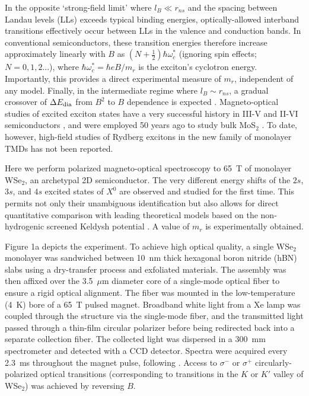 \documentclass[aps,prl,twocolumn]{revtex4-1}
\begin{document}
In the opposite `strong-field limit' where $l_B \ll r_{ns}$ and the spacing between Landau levels (LLs) exceeds typical binding energies, optically-allowed interband transitions effectively occur between LLs in the valence and conduction bands.  In conventional semiconductors, these transition energies therefore increase approximately linearly with $B$ as $ (N + \frac{1}{2})\hbar \omega_c^*$ (ignoring spin effects; $N=0, 1, 2...$), where $\hbar \omega_c^* = \hbar eB/m_r$ is the exciton's cyclotron energy. Importantly, this provides a direct experimental measure of $m_r$, independent of any model. Finally, in the intermediate regime where $l_B \sim r_{ns}$, a gradual crossover of $\Delta E_{\rm dia}$ from $B^2$ to $B$ dependence is expected \cite{Miura, Knox, Hasegawa, Ritchie, Edelstein}.  Magneto-optical studies of excited exciton states have a very successful history in III-V and II-VI semiconductors \cite{Miura, Knox}, and were employed 50 years ago to study bulk MoS$_2$ \cite{Evans}. To date, however, high-field studies of Rydberg excitons in the new family of monolayer TMDs has not been reported. 

Here we perform polarized magneto-optical spectroscopy to 65~T of monolayer WSe$_2$, an archetypal 2D semiconductor. The very different energy shifts of the $2s$, $3s$, and $4s$ excited states of $X^0$ are observed and studied for the first time.  This permits not only their unambiguous identification but also allows for direct quantitative comparison with leading theoretical models based on the non-hydrogenic screened Keldysh potential \cite{Berkelbach, Macdonald, Kyla}. A value of $m_r$ is experimentally obtained.

Figure 1a depicts the experiment. To achieve high optical quality, a single WSe$_2$ monolayer was sandwiched between 10~nm thick hexagonal boron nitride (hBN) slabs using a dry-transfer process and exfoliated materials.  The assembly was then affixed over the 3.5~$\mu$m diameter core of a single-mode optical fiber to ensure a rigid optical alignment. The fiber was mounted in the low-temperature (4~K) bore of a 65~T pulsed magnet.  Broadband white light from a Xe lamp was coupled through the structure via the single-mode fiber, and the transmitted light passed through a thin-film circular polarizer before being redirected back into a separate collection fiber. The collected light was dispersed in a 300~mm spectrometer and detected with a CCD detector.  Spectra were acquired every 2.3~ms throughout the magnet pulse, following \cite{Stier_Nano}.  Access to $\sigma^-$ or $\sigma^+$ circularly-polarized optical transitions (corresponding to transitions in the $K$ or $K'$ valley of WSe$_2$) was achieved by reversing $B$.
\end{document}
